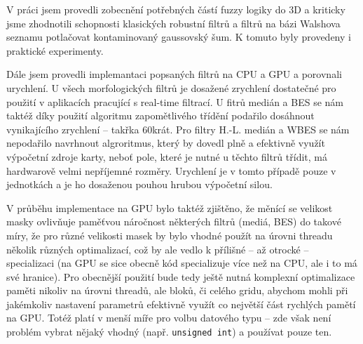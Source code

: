 
V práci jsem provedli zobecnění potřebných částí fuzzy logiky do 3D a kriticky jsme zhodnotili schopnosti klasických robustní filtrů a filtrů na bázi Walshova seznamu potlačovat kontaminovaný gaussovský šum. K tomuto byly provedeny i praktické experimenty.

Dále jsem provedli implemantaci popsaných filtrů na CPU a GPU a porovnali urychlení. U všech morfologických filtrů je dosažené zrychlení dostatečné pro použití v aplikacích pracující s real-time filtrací. U fitrů medián a BES se nám taktéž díky použití algoritmu zapomětlivého třídění podařilo dosáhnout vynikajícího zrychlení -- takřka 60krát. Pro filtry H.-L. medián a WBES se nám nepodařilo navrhnout algroritmus, který by dovedl plně a efektivně využít výpočetní zdroje karty, neboť pole, které je nutné u těchto filtrů třídit, má hardwarově velmi nepříjemné rozměry. Urychlení je v tomto případě pouze v jednotkách a je ho dosaženou pouhou hrubou výpočetní silou.

V průběhu implementace na GPU bylo taktéž zjištěno, že měnící se velikost masky ovlivňuje paměťvou náročnost některých filtrů (mediá, BES) do takové míry, že pro různé velikosti masek by bylo vhodné použít na úrovni threadu několik různých optimalizací, což by ale vedlo k přílišné -- až otrocké -- specializaci (na GPU se sice obecně kód specializuje více než na CPU, ale i to má své hranice). Pro obecnější použití bude tedy ještě nutná komplexní optimalizace paměti nikoliv na úrovni threadů, ale bloků, či celého gridu, abychom mohli při jakémkoliv nastavení parametrů efektivně využít co největší část rychlých pamětí na GPU. Totéž platí v menší míře pro volbu datového typu -- zde však není problém vybrat nějaký vhodný (např. {\tt unsigned int}) a používat pouze ten.
